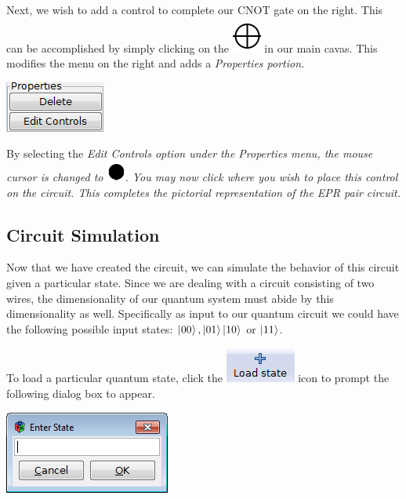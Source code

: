 \documentclass[10pt]{article}
\theoremstyle{definition}
\newcommand{\microspace}{\mspace{0.5mu}}
\def \lket {\left|}
\def \rket {\right\rangle}
\newcommand{\ket}[1]{\lket\microspace #1 \microspace\rket}
\begin{document}
Next, we wish to add a control to complete our CNOT gate on the right. This can be accomplished by simply clicking on the \includegraphics[scale=0.60]{Figures/CreateCircuit/CNOT} in our main cavas. This modifies the menu on the right and adds a \em Properties \em portion. 

\begin{center}
\includegraphics{Figures/CreateCircuit/Properties.png}
\end{center}

By selecting the \em Edit Controls \em option under the \em Properties \em menu, the mouse cursor is changed to \includegraphics[scale=0.5]{Figures/CreateCircuit/Cursor.png}. You may now click where you wish to place this control on the circuit. This completes the pictorial representation of the EPR pair circuit. 

\subsection{Circuit Simulation}\label{sub:CircuitSimulation}
Now that we have created the circuit, we can simulate the behavior of this circuit given a particular state. Since we are dealing with a circuit consisting of two wires, the dimensionality of our quantum system must abide by this dimensionality as well. Specifically as input to our quantum circuit we could have the following possible input states: $\ket{00}, \ket{01} \ket{10}$ or $\ket{11}$. 

To load a particular quantum state, click the \includegraphics[scale=0.60]{Figures/Navigation/LoadState.png} icon to prompt the following dialog box to appear.

\begin{center}
\includegraphics{Figures/CreateCircuit/LoadState.png}
\end{center}
\end{document}
